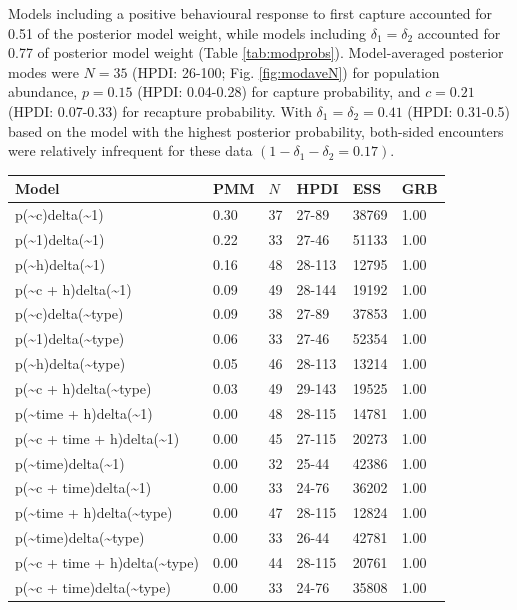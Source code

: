 \documentclass[12pt]{article}
\begin{document}
Models including a positive behavioural response to first capture accounted for 0.51 of the posterior model weight, while models including $\delta_1=\delta_2$ accounted for 0.77 of posterior model weight (Table \ref{tab:modprobs}). Model-averaged posterior modes were $N=35$ (HPDI: 26-100; Fig. \ref{fig:modaveN}) for population abundance, $p=0.15$ (HPDI: 0.04-0.28) for capture probability, and $c=0.21$ (HPDI: 0.07-0.33) for recapture probability. With $\delta_1=\delta_2=0.41$ (HPDI: 0.31-0.5) based on the model with the highest posterior probability, both-sided encounters were relatively infrequent for these data $(1-\delta_1-\delta_2=0.17)$.
\begin{table}[ht]
\centering
\begin{tabular}{llllll}
  \hline
Model & PMM & $N$ & HPDI & ESS & GRB \\ 
  \hline
p(\~{}c)delta(\~{}1) & 0.30 & 37 & 27-89 & 38769 & 1.00 \\ 
  p(\~{}1)delta(\~{}1) & 0.22 & 33 & 27-46 & 51133 & 1.00 \\ 
  p(\~{}h)delta(\~{}1) & 0.16 & 48 & 28-113 & 12795 & 1.00 \\ 
  p(\~{}c + h)delta(\~{}1) & 0.09 & 49 & 28-144 & 19192 & 1.00 \\ 
  p(\~{}c)delta(\~{}type) & 0.09 & 38 & 27-89 & 37853 & 1.00 \\ 
  p(\~{}1)delta(\~{}type) & 0.06 & 33 & 27-46 & 52354 & 1.00 \\ 
  p(\~{}h)delta(\~{}type) & 0.05 & 46 & 28-113 & 13214 & 1.00 \\ 
  p(\~{}c + h)delta(\~{}type) & 0.03 & 49 & 29-143 & 19525 & 1.00 \\ 
  p(\~{}time + h)delta(\~{}1) & 0.00 & 48 & 28-115 & 14781 & 1.00 \\ 
  p(\~{}c + time + h)delta(\~{}1) & 0.00 & 45 & 27-115 & 20273 & 1.00 \\ 
  p(\~{}time)delta(\~{}1) & 0.00 & 32 & 25-44 & 42386 & 1.00 \\ 
  p(\~{}c + time)delta(\~{}1) & 0.00 & 33 & 24-76 & 36202 & 1.00 \\ 
  p(\~{}time + h)delta(\~{}type) & 0.00 & 47 & 28-115 & 12824 & 1.00 \\ 
  p(\~{}time)delta(\~{}type) & 0.00 & 33 & 26-44 & 42781 & 1.00 \\ 
  p(\~{}c + time + h)delta(\~{}type) & 0.00 & 44 & 28-115 & 20761 & 1.00 \\ 
  p(\~{}c + time)delta(\~{}type) & 0.00 & 33 & 24-76 & 35808 & 1.00 \\ 

\end{tabular}
\end{table}
\end{document}
